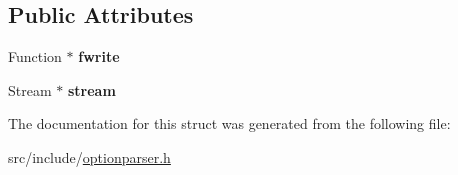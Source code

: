 \subsection*{Public Attributes}
\begin{DoxyCompactItemize}
\item 
\hypertarget{structxmem_1_1config_1_1third__party_1_1_print_usage_implementation_1_1_stream_writer_acf48d2de031f76c609ab518fc757cfc1}{}Function $\ast$ {\bfseries fwrite}\label{structxmem_1_1config_1_1third__party_1_1_print_usage_implementation_1_1_stream_writer_acf48d2de031f76c609ab518fc757cfc1}

\item 
\hypertarget{structxmem_1_1config_1_1third__party_1_1_print_usage_implementation_1_1_stream_writer_ad0c294cda61db3cc2f7776def7466217}{}Stream $\ast$ {\bfseries stream}\label{structxmem_1_1config_1_1third__party_1_1_print_usage_implementation_1_1_stream_writer_ad0c294cda61db3cc2f7776def7466217}

\end{DoxyCompactItemize}


The documentation for this struct was generated from the following file\+:\begin{DoxyCompactItemize}
\item 
src/include/\hyperlink{optionparser_8h}{optionparser.\+h}\end{DoxyCompactItemize}
